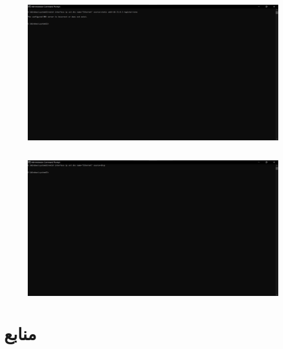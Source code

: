 \documentclass{article}
\begin{document}
\subsection{}
\begin{figure}[H]
    \centering
    \includegraphics[width=1.0\textwidth]{figures/9.3.jpg}
    \caption
	{
	}
    \label{fig:fig1}
\end{figure}
\subsection{}
\begin{figure}[H]
    \centering
    \includegraphics[width=1.0\textwidth]{figures/9.4.jpg}
    \caption
	{
	}
    \label{fig:fig1}
\end{figure}

\section*{منابع}
\renewcommand{\section}[2]{}%
\begin{thebibliography}{99} %


\begin{LTRitems}

\resetlatinfont

\end{LTRitems}

\end{thebibliography}
\end{document}
